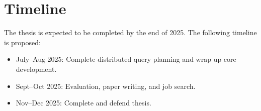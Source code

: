 


\section{Timeline}

The thesis is expected to be completed by the end of 2025.
The following timeline is proposed:

\begin{itemize}
  \item July--Aug 2025: Complete distributed query planning and wrap up core development.
  \item Sept--Oct 2025: Evaluation, paper writing, and job search.
  \item Nov--Dec 2025: Complete and defend thesis.
\end{itemize}